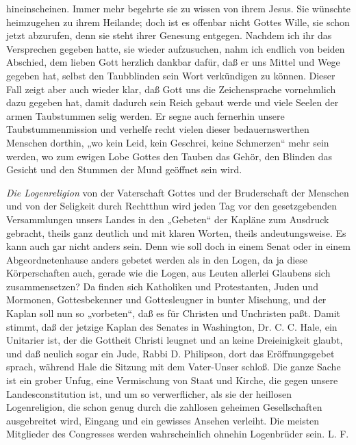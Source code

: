 hineinscheinen. Immer mehr begehrte sie zu wissen von ihrem Jesus. Sie wünschte heimzugehen zu ihrem Heilande; doch ist es offenbar nicht Gottes Wille, sie schon jetzt abzurufen, denn sie steht ihrer Genesung entgegen. Nachdem ich ihr das Versprechen gegeben hatte, sie wieder aufzusuchen, nahm ich endlich von beiden Abschied, dem lieben Gott herzlich dankbar dafür, daß er uns Mittel und Wege gegeben hat, selbst den Taubblinden sein Wort verkündigen zu können. Dieser Fall zeigt aber auch wieder klar, daß Gott uns die Zeichensprache vornehmlich dazu gegeben hat, damit dadurch sein Reich gebaut werde und viele Seelen der armen Taubstummen selig werden. Er segne auch fernerhin unsere Taubstummenmission und verhelfe recht vielen dieser bedauernswerthen Menschen dorthin, „wo kein Leid, kein Geschrei, keine Schmerzen“ mehr sein werden, wo zum ewigen Lobe Gottes den Tauben das Gehör, den Blinden das Gesicht und den Stummen der Mund geöffnet sein wird.

\begin{unterschrift}
\end{unterschrift}

\emph{Die Logenreligion} von der Vaterschaft Gottes und der Bruderschaft der Menschen und von der Seligkeit durch Rechtthun wird jeden Tag vor den gesetzgebenden Versammlungen unsers Landes in den „Gebeten“ der Kapläne zum Ausdruck gebracht, theils ganz deutlich und mit klaren Worten, theils andeutungsweise. Es kann auch gar nicht anders sein. Denn wie soll doch in einem Senat oder in einem Abgeordnetenhause anders gebetet werden als in den Logen, da ja diese Körperschaften auch, gerade wie die Logen, aus Leuten allerlei Glaubens sich zusammensetzen? Da finden sich Katholiken und Protestanten, Juden und Mormonen, Gottesbekenner und Gottesleugner in bunter Mischung, und der Kaplan soll nun so „vorbeten“, daß es für Christen und Unchristen paßt. Damit stimmt, daß der jetzige Kaplan des Senates in Washington, Dr. C. C. Hale, ein Unitarier ist, der die Gottheit Christi leugnet und an keine Dreieinigkeit glaubt, und daß neulich sogar ein Jude, Rabbi D. Philipson, dort das Eröffnungsgebet sprach, während Hale die Sitzung mit dem Vater-Unser schloß. Die ganze Sache ist ein grober Unfug, eine Vermischung von Staat und Kirche, die gegen unsere Landesconstitution ist, und um so verwerflicher, als sie der heillosen Logenreligion, die schon genug durch die zahllosen geheimen Gesellschaften ausgebreitet wird, Eingang und ein gewisses Ansehen verleiht. Die meisten Mitglieder des Congresses werden wahrscheinlich ohnehin Logenbrüder sein. L. F.

